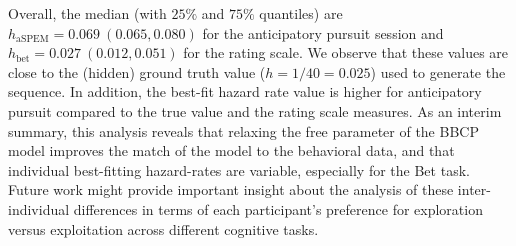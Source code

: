 \documentclass[10pt,letterpaper]{article}
\newcommand{\citep}[1]{\cite{#1}}
\newcommand{\LP}[1]{\textbf{\textcolor{red}{[LP: #1]}}}
\newcommand{\CP}[1]{\textbf{\textcolor{green}{[CP: #1]}}}
\begin{document}
Overall, the median (with $25\%$ and $75\%$ quantiles) are $h_{\text{aSPEM}} = 0.069 ~ (0.065, 0.080)$ %
for the anticipatory pursuit session and
$h_{\text{bet}} = 0.027 ~ (0.012, 0.051)$ %
for the rating scale.
We observe that these values are close to the (hidden) ground truth value ($h=1/40=0.025$) used to generate the sequence.
In addition, the best-fit hazard rate value is higher for anticipatory pursuit compared to the true value and the rating scale measures.
As an interim summary, this analysis reveals
that relaxing the free parameter of the BBCP model
improves the match of the model to the behavioral data, and that individual best-fitting hazard-rates are variable, especially for the Bet task.
Future work might provide important insight about the analysis of these inter-individual differences in terms of each participant's preference for exploration versus exploitation across different cognitive tasks.
\end{document}
